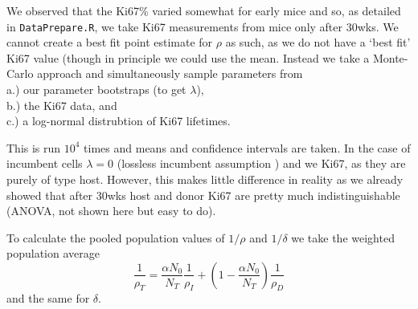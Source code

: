 \documentclass{tufte-book} %
\begin{document}
We observed that the Ki67\% varied somewhat for early mice and so, as detailed in \texttt{DataPrepare.R}, we take Ki67 measurements from mice only after 30wks. We cannot create a best fit point estimate for $\rho$ as such, as we do not have a `best fit' Ki67 value (though in principle we could use the mean. Instead we take a Monte-Carlo approach and simultaneously sample parameters from \\
a.) our parameter bootstraps (to get $\lambda$),\\
b.) the Ki67 data, and\\
c.) a log-normal distrubtion of Ki67 lifetimes. 


This is run $10^4$ times and means and confidence intervals are taken. In the case of incumbent cells $\lambda = 0$ (lossless incumbent assumption ) and we  Ki67, as they are purely of type host. However, this makes little difference in reality as we already showed that after 30wks host and donor Ki67 are pretty much indistinguishable (ANOVA, not shown here but easy to do).

To calculate the pooled population values of $1/\rho$ and $1/\delta$ we take the weighted population average 
\begin{equation}
\frac{1}{\rho_T }= \frac{\alpha  N_0}{N_T}\frac{1}{\rho_I}+\left(1-\frac{\alpha  N_0}{N_T}\right)\frac{1}{\rho_D}
\end{equation}
and the same for $\delta$.





\printindex %
\end{document}
